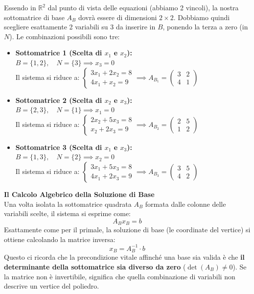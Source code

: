 \documentclass[12pt, a4paper]{article}
\begin{document}
	Essendo in $\mathbb{R}^2$ dal punto di vista delle equazioni (abbiamo 2 vincoli), la nostra sottomatrice di base $A_B$ dovrà essere di dimensioni $2 \times 2$. Dobbiamo quindi scegliere esattamente 2 variabili su 3 da inserire in $B$, ponendo la terza a zero (in $N$). Le combinazioni possibili sono tre:
	
	\begin{itemize}[label=$\circ$, itemsep=6pt, leftmargin=1.5cm]
		\item \textbf{Sottomatrice 1 (Scelta di $x_1$ e $x_2$):}\\
		$B = \{1, 2\}, \quad N = \{3\} \implies x_3 = 0$\\
		Il sistema si riduce a:
		$\begin{cases} 3x_1 + 2x_2 = 8 \\ 4x_1 + x_2 = 9 \end{cases} \implies A_{B_1} = \begin{pmatrix} 3 & 2 \\ 4 & 1 \end{pmatrix}$
		
		\item \textbf{Sottomatrice 2 (Scelta di $x_2$ e $x_3$):}\\
		$B = \{2, 3\}, \quad N = \{1\} \implies x_1 = 0$\\
		Il sistema si riduce a:
		$\begin{cases} 2x_2 + 5x_3 = 8 \\ x_2 + 2x_3 = 9 \end{cases} \implies A_{B_2} = \begin{pmatrix} 2 & 5 \\ 1 & 2 \end{pmatrix}$
		
		\item \textbf{Sottomatrice 3 (Scelta di $x_1$ e $x_3$):}\\
		$B = \{1, 3\}, \quad N = \{2\} \implies x_2 = 0$\\
		Il sistema si riduce a:
		$\begin{cases} 3x_1 + 5x_3 = 8 \\ 4x_1 + 2x_3 = 9 \end{cases} \implies A_{B_3} = \begin{pmatrix} 3 & 5 \\ 4 & 2 \end{pmatrix}$
	\end{itemize}
	
	\vspace{0.4cm}
	\textbf{Il Calcolo Algebrico della Soluzione di Base}\\
	Una volta isolata la sottomatrice quadrata $A_B$ formata dalle colonne delle variabili scelte, il sistema si esprime come:
	\[
	A_B x_B = b
	\]
	Esattamente come per il primale, la soluzione di base (le coordinate del vertice) si ottiene calcolando la matrice inversa:
	\[
	x_B = A_B^{-1} \cdot b
	\]
	Questo ci ricorda che la precondizione vitale affinché una base sia valida è che \textbf{il determinante della sottomatrice sia diverso da zero} ($\det(A_B) \neq 0$). Se la matrice non è invertibile, significa che quella combinazione di variabili non descrive un vertice del poliedro.
	
\end{document}
